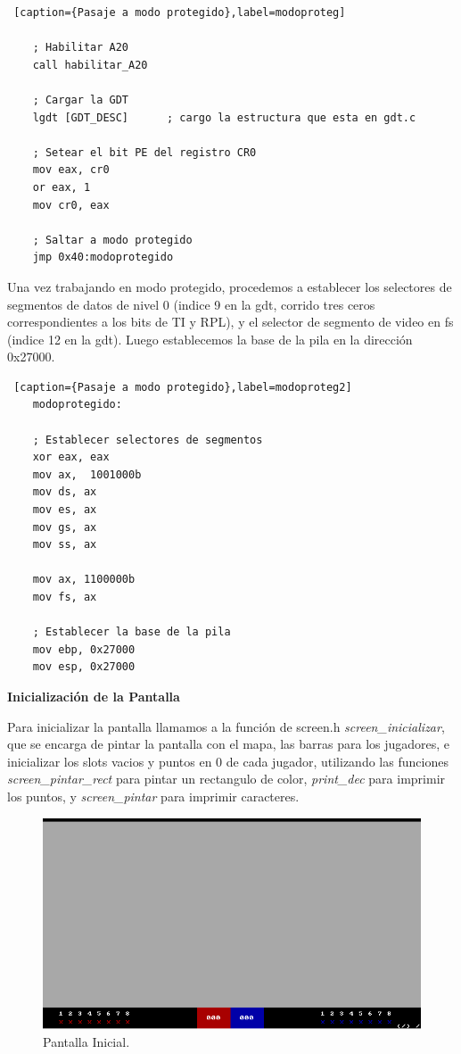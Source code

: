 \documentclass[a4paper]{article}
\begin{document}
\begin{lstlisting} [caption={Pasaje a modo protegido},label=modoproteg]
    
    ; Habilitar A20
    call habilitar_A20  
   
    ; Cargar la GDT
	lgdt [GDT_DESC]      ; cargo la estructura que esta en gdt.c

    ; Setear el bit PE del registro CR0
    mov eax, cr0
	or eax, 1
	mov cr0, eax

    ; Saltar a modo protegido
	jmp 0x40:modoprotegido

\end{lstlisting}

\newpage

\par Una vez trabajando en modo protegido, procedemos a establecer los selectores de segmentos de datos de nivel 0 (indice 9 en la gdt, corrido tres ceros correspondientes a los bits de TI y RPL), y el selector de segmento de video en fs (indice 12 en la gdt). Luego establecemos la base de la pila en la dirección 0x27000.


\begin{lstlisting} [caption={Pasaje a modo protegido},label=modoproteg2]
    modoprotegido:
    
    ; Establecer selectores de segmentos
    xor eax, eax
	mov ax,  1001000b
	mov ds, ax
	mov es, ax
	mov gs, ax
	mov ss, ax
    
	mov ax, 1100000b
    mov fs, ax

    ; Establecer la base de la pila
	mov ebp, 0x27000
	mov esp, 0x27000

\end{lstlisting}

\textbf{Inicialización de la Pantalla}

\par Para inicializar la pantalla llamamos a la función de screen.h \emph{screen_inicializar}, que se encarga de pintar la pantalla con el mapa, las barras para los jugadores, e inicializar los slots vacios y puntos en 0 de cada jugador, utilizando las funciones \emph{screen_pintar_rect} para pintar un rectangulo de color, \emph{print_dec} para imprimir los puntos, y \emph{screen_pintar} para imprimir caracteres.

\begin{figure}[ht!]
\centering
\includegraphics[width=120mm]{imagenes/pantalla.png}
\caption{Pantalla Inicial.}
\end{figure}
\end{document}
